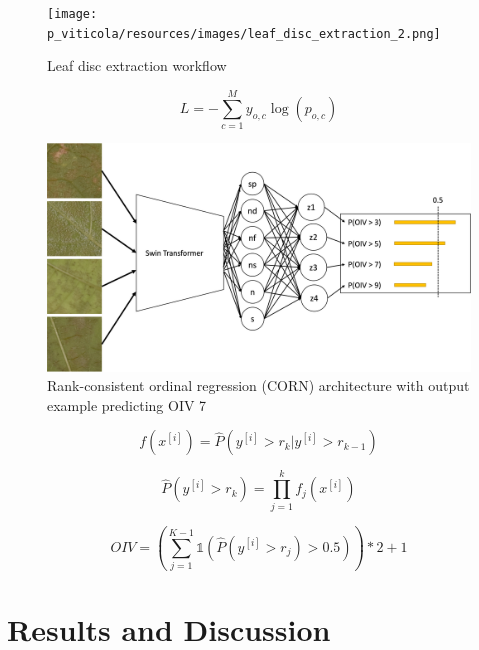 \documentclass[english]{article}
\begin{document}
\begin{figure}[H]
    \begin{center}
        \texttt{[image: p\_viticola/resources/images/leaf\_disc\_extraction\_2.png]}
        \caption{Leaf disc extraction workflow}\label{fig:preprocessing}
    \end{center}
\end{figure}


\begin{equation}
    L = -\sum_{c=1}^My_{o,c}\log(p_{o,c})\label{fml:crossentropy}
\end{equation}

\begin{figure}[H]
    \centering
    \includegraphics[width=0.9\linewidth]{p_viticola/resources/images/2023_a_oiv_bin_corn.png}
    \caption{Rank-consistent ordinal regression (CORN) architecture with output example predicting OIV 7}
    \label{fig:corn}
\end{figure}

\begin{equation}
    f(x^{[i]}) = \hat{P}(y^{[i]} > r_{k}|y^{[i]} > r_{k-1})\label{fml:binclass}
\end{equation}

\begin{equation}
    \hat{P}(y^{[i]} > r_{k}) = \prod_{j=1}^{k}f_{j}(x^{[i]})\label{fml:unconditionalprob}
\end{equation}

\begin{equation}
    OIV = (\sum_{j=1}^{K-1}\mathbb{1}(\hat{P}(y^{[i]} > r_{j}) > 0.5))*2 + 1\label{fml:rankprob}
\end{equation}

\section{Results and Discussion}
\end{document}
